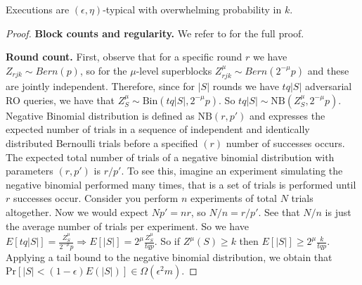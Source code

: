 \begin{thm}[Typicality]\label{thm:superblock_typicality}
	Executions are $(\epsilon, \eta)$-typical with overwhelming probability in $k$.
\end{thm}
\begin{proof}
	\textbf{Block counts and regularity.} We refer to \cite{backbone} for
	the full proof.

	\textbf{Round count.} First, observe that for a specific round $r$ we have $Z_{rjk}
	\sim Bern(p)$, so for the $\mu$-level superblocks $Z_{rjk}^\mu \sim Bern(2^{-\mu}p)$
	and these are jointly independent. Therefore, since for $\vert S \vert$ rounds we
	have $tq\vert S \vert$ adversarial RO queries, we have that $Z_S^\mu \sim
	\text{Bin}(tq \vert S \vert, 2^{-\mu}p)$. So $tq \vert S \vert \sim
	\text{NB}(Z_S^\mu, 2^{-\mu}p)$. Negative Binomial distribution is defined
	as $\text{NB}(r, p')$ and expresses the expected number of trials in a sequence of
	independent and identically distributed Bernoulli trials before a specified
	$(r)$ number of successes occurs. The expected total number of trials of a
	negative binomial distribution with parameters $(r, p')$ is $r/p'$. To see
	this, imagine an experiment simulating the negative binomial performed many
	times, that is a set of trials is performed until $r$ successes occur. Consider
	you perform $n$ experiments of total $N$ trials altogether. Now we would expect $Np' = nr$,
	so $N/n = r/p'$. See that $N/n$ is just the average number of trials per
	experiment. So we have $E[tq \vert S \vert] = \frac{Z^\mu_S}{2^{-\mu}p}
	\Rightarrow E[\vert S \vert] = 2^\mu \frac{Z^\mu_S}{tqp}$. So if $Z^\mu(S) \geq k$
	then $E[\vert S \vert] \geq 2^\mu \frac{k}{tqp}$. Applying a tail bound to the
	negative binomial distribution, we obtain that $\text{Pr}[\vert S \vert < (1 -
	\epsilon)E(\vert S \vert)] \in \Omega(\epsilon^{2}m)$.
\end{proof}

